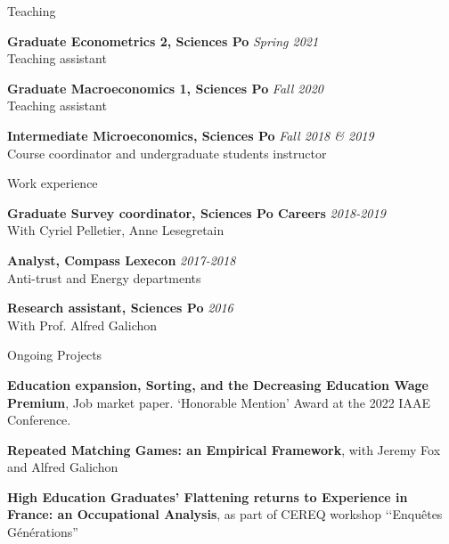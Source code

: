 \documentclass{resume} %
\begin{document}

\begin{rSection}{Teaching}

{\bf Graduate Econometrics 2, Sciences Po} \hfill {\em Spring 2021}
  \\ Teaching assistant

{\bf Graduate Macroeconomics 1, Sciences Po} \hfill {\em Fall 2020}
  \\ Teaching assistant


{\bf Intermediate Microeconomics, Sciences Po} \hfill {\em Fall 2018 \& 2019}
\\ Course coordinator and undergraduate students instructor

\end{rSection}


\begin{rSection}{Work experience}

  {\bf Graduate Survey coordinator, Sciences Po Careers} \hfill {\em 2018-2019} \\
  With Cyriel Pelletier, Anne Lesegretain

{\bf Analyst, Compass Lexecon} \hfill {\em 2017-2018}
\\ Anti-trust and Energy departments

{\bf Research assistant, Sciences Po} \hfill {\em 2016}
\\ With Prof. Alfred Galichon

\end{rSection}


\begin{rSection}{Ongoing Projects}

{\bf Education expansion, Sorting, and the Decreasing Education Wage Premium}, Job market paper. ‘Honorable Mention' Award at the 2022 IAAE Conference.

{\bf Repeated Matching Games: an Empirical Framework}, with Jeremy Fox and Alfred Galichon

{\bf High Education Graduates' Flattening returns to Experience in France: an Occupational Analysis}, as part of CEREQ workshop ‘‘Enquêtes Générations''

\end{rSection}
\end{document}
